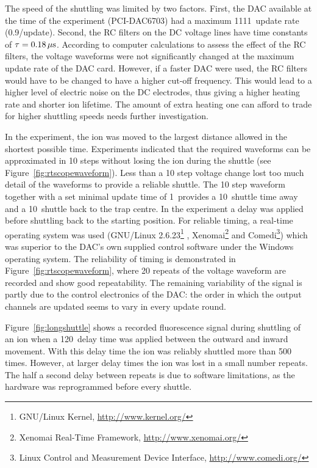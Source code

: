The speed of the shuttling was limited by two factors. First, the DAC available at the time of the experiment (PCI-DAC6703) had a maximum 1111\Hz\, update rate (0.9\ms/update). Second, the RC filters on the DC voltage lines have time constants of $\tau = 0.18\,\mbox{$\mu$s}$. According to computer calculations to assess the effect of the  RC filters, the voltage waveforms were not significantly changed at the maximum update rate of the DAC card. However, if a faster DAC were used, the RC filters would have to be changed to have a higher cut-off frequency. This would lead to a higher level of electric noise on the DC electrodes, thus giving a higher heating rate and shorter ion lifetime. The amount of extra heating one can afford to trade for higher shuttling speeds needs further investigation.

In the experiment, the ion was moved to the largest distance allowed in the shortest possible time. Experiments indicated that the required waveforms can be approximated in 10 steps without losing the ion during the shuttle (see Figure~\ref{fig:rtscopewaveform}). Less than a 10 step voltage change lost too much detail of the waveforms to provide a reliable shuttle. The 10 step waveform together with a set minimal update time of 1\ms\, provides a 10\ms\, shuttle time away and a 10\ms\, shuttle back to the trap centre. In the experiment a delay was applied before shuttling back to the starting position. For reliable timing, a real-time operating system was used (GNU/Linux 2.6.23\footnote{GNU/Linux Kernel, \url{http://www.kernel.org/}} , Xenomai\footnote{Xenomai Real-Time Framework, \url{http://www.xenomai.org/}} and Comedi\footnote{Linux Control and  Measurement Device Interface, \url{http://www.comedi.org/}}) which was superior to the DAC's own supplied control software under the Windows operating system. The reliability of timing is demonstrated in Figure~\ref{fig:rtscopewaveform}, where 20 repeats of the voltage waveform are recorded and show good repeatability. The remaining variability of the signal is partly due to the control electronics of the DAC: the order in which the output channels are updated seems to vary in every update round.

Figure~\ref{fig:longshuttle} shows a recorded fluorescence signal during shuttling of an ion when a 120\ms\, delay time was applied  between the outward and inward movement. With this delay time the ion was reliably shuttled more than 500 times. However, at larger delay times the ion was lost in a small number repeats.  The half a second delay between repeats is due to software limitations, as the hardware was reprogrammed before every shuttle.

